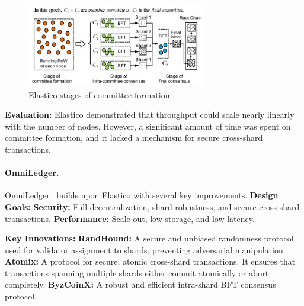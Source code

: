 \begin{figure}[b]
	\begin{center}
		\includegraphics[width=0.7\textwidth]{./figs/elastico.png}
		\caption{Elastico stages of committee formation.}		
		\label{fig:elastico}
	\end{center}	
\end{figure}


\textbf{Evaluation:} Elastico demonstrated that throughput could scale
nearly linearly with the number of nodes. However, a significant amount
of time was spent on committee formation, and it lacked a mechanism for
secure cross-shard transactions.


\paragraph{OmniLedger.}\label{omniledger}

OmniLedger~\cite{kokoris2018omniledger} builds upon Elastico with several key improvements.
\textbf{Design Goals:}  \textbf{Security:} Full decentralization, shard
robustness, and secure cross-shard transactions.  \textbf{Performance:}
Scale-out, low storage, and low latency.

\textbf{Key Innovations:} \textbf{RandHound:} A secure and unbiased
randomness protocol used for validator assignment to shards, preventing
adversarial manipulation. \textbf{Atomix:} A protocol for secure,
atomic cross-shard transactions. It ensures that transactions spanning
multiple shards either commit atomically or abort completely.
\textbf{ByzCoinX:} A robust and efficient intra-shard BFT consensus
protocol.


